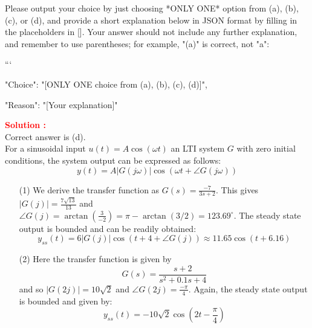 \documentclass[12pt]{article}
\begin{document}
Please output your choice by just choosing *ONLY ONE* option from (a), (b), (c), or (d), and provide a short explanation below in JSON format by filling in the placeholders in []. Your answer should not include any further explanation, and remember to use parentheses; for example, "(a)" is correct, not "a": 

```
{

"Choice": "[ONLY ONE choice from (a), (b), (c), (d)]",

"Reason": "[Your explanation]"

}




\textbf{\textcolor{red}{Solution :}} \\
Correct answer is (d).\\
For a sinusoidal input $u(t)=A \cos (\omega t)$ an LTI system $G$ with zero initial conditions, the system output can be expressed as follows:
$$
y(t)=A|G(j \omega)| \cos (\omega t+\angle G(j \omega))
$$
\begin{itemize}
    \item [(1)]  We derive the transfer function as $G(s)=\frac{-7}{3 s+2}$. This gives $|G(j)|=\frac{7 \sqrt{13}}{13}$ and $\angle G(j)=\arctan \left(\frac{3}{-2}\right)=\pi-\arctan (3 / 2)=123.69^{\circ}$. The steady state output is bounded and can be readily obtained:
$$
y_{s s}(t)=6|G(j)| \cos (t+4+\angle G(j)) \approx 11.65 \cos (t+6.16)
$$
    \item [(2)] Here the transfer function is given by
        $$ G(s)=\frac{s+2}{s^2+0.1s+4} $$
and so $|G(2j)| = 10 \sqrt{2}$ and $\angle G(2j) = \frac{-\pi}{4}$. Again, the steady state output is bounded and given by:
$$y_{ss}(t)=-10\sqrt{2}\cos{\left( 2 t -\frac{\pi}{4} \right)}$$
\end{itemize}
\clearpage
\end{document}
